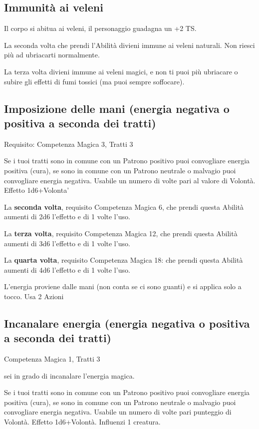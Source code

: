 \documentclass[a4paper,11pt,twoside,openany]{book}
\begin{document}
\subsection{Immunità ai veleni}

Il corpo si abitua ai veleni, il personaggio guadagna un +2 TS.

La seconda volta che prendi l'Abilità divieni immune ai veleni naturali.
Non riesci più ad ubriacarti normalmente.

La terza volta divieni immune ai veleni magici, e non ti puoi più ubriacare o subire gli effetti di fumi tossici (ma puoi sempre soffocare).

\subsection{Imposizione delle mani (energia negativa o positiva a seconda dei tratti)}

Requisito: Competenza Magica 3, Tratti 3

Se i tuoi tratti sono in comune con un Patrono positivo puoi convogliare energia positiva (cura), se sono in comune con un Patrono neutrale o malvagio puoi convogliare energia negativa. Usabile un numero di volte pari al valore di Volontà. Effetto 1d6+Volonta'

La \textbf{seconda volta}, requisito Competenza Magica 6, che prendi questa Abilità aumenti di 2d6 l'effetto e di 1 volte l'uso.

La \textbf{terza volta}, requisito Competenza Magica 12, che prendi questa Abilità aumenti di 3d6 l'effetto e di 1 volte l'uso.

La \textbf{quarta volta}, requisito Competenza Magica 18: che prendi questa Abilità aumenti di 4d6 l'effetto e di 1 volte l'uso.

L'energia proviene dalle mani (non conta se ci sono guanti) e si applica solo a tocco. Usa 2 Azioni

\subsection{Incanalare energia (energia negativa o positiva a seconda dei tratti)}

Competenza Magica 1, Tratti 3

sei in grado di incanalare l'energia magica.

Se i tuoi tratti sono in comune con un Patrono positivo puoi convogliare energia positiva (cura), se sono in comune con un Patrono neutrale o malvagio puoi convogliare energia negativa. Usabile un numero di volte pari punteggio di Volontà. Effetto 1d6+Volontà. Influenzi 1 creatura.
\end{document}
